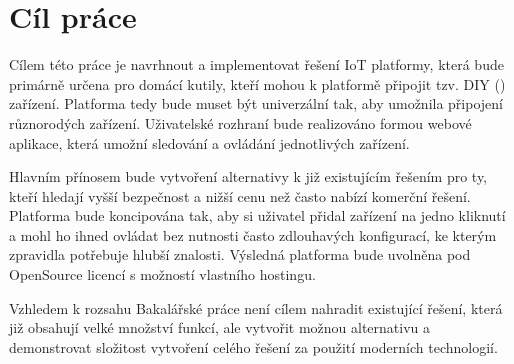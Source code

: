 \documentclass[thesis=B,czech]{FITthesis}[2019/12/23]
\begin{document}
\chapter{Cíl práce}
Cílem této práce je navrhnout a implementovat řešení IoT platformy, která bude primárně určena pro domácí kutily, kteří mohou k platformě připojit tzv. DIY () zařízení. Platforma tedy bude muset být univerzální tak, aby umožnila připojení různorodých zařízení. Uživatelské rozhraní bude realizováno formou webové aplikace, která umožní sledování a ovládání jednotlivých zařízení.

Hlavním přínosem bude vytvoření alternativy k již existujícím řešením pro ty, kteří hledají vyšší bezpečnost a nižší cenu než často nabízí komerční řešení. Platforma bude koncipována tak, aby si uživatel přidal zařízení na jedno kliknutí a mohl ho ihned ovládat bez nutnosti často zdlouhavých konfigurací, ke kterým zpravidla potřebuje hlubší znalosti. Výsledná platforma bude uvolněna pod OpenSource licencí s možností vlastního hostingu.

Vzhledem k rozsahu Bakalářské práce není cílem nahradit existující řešení, která již obsahují velké množství funkcí, ale vytvořit možnou alternativu a demonstrovat složitost vytvoření celého řešení za použití moderních technologií.








\end{document}

